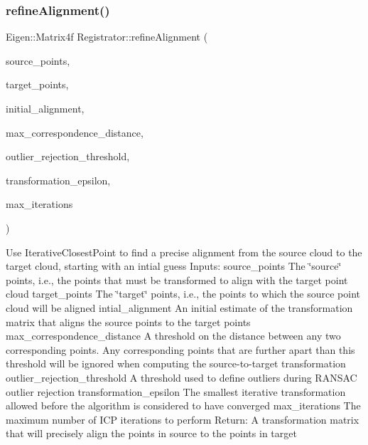 \subsubsection{\texorpdfstring{refine\+Alignment()}{refineAlignment()}}
{\footnotesize\ttfamily Eigen\+::\+Matrix4f Registrator\+::refine\+Alignment (\begin{DoxyParamCaption}\item[{const pcl\+::\+Point\+Cloud$<$ pcl\+::\+Point\+X\+Y\+Z\+R\+GB $>$\+::Ptr \&}]{source\+\_\+points,  }\item[{const pcl\+::\+Point\+Cloud$<$ pcl\+::\+Point\+X\+Y\+Z\+R\+GB $>$\+::Ptr \&}]{target\+\_\+points,  }\item[{const Eigen\+::\+Matrix4f \&}]{initial\+\_\+alignment,  }\item[{float}]{max\+\_\+correspondence\+\_\+distance,  }\item[{float}]{outlier\+\_\+rejection\+\_\+threshold,  }\item[{float}]{transformation\+\_\+epsilon,  }\item[{int}]{max\+\_\+iterations }\end{DoxyParamCaption})}

Use Iterative\+Closest\+Point to find a precise alignment from the source cloud to the target cloud, starting with an intial guess Inputs\+: source\+\_\+points The \char`\"{}source\char`\"{} points, i.\+e., the points that must be transformed to align with the target point cloud target\+\_\+points The \char`\"{}target\char`\"{} points, i.\+e., the points to which the source point cloud will be aligned intial\+\_\+alignment An initial estimate of the transformation matrix that aligns the source points to the target points max\+\_\+correspondence\+\_\+distance A threshold on the distance between any two corresponding points. Any corresponding points that are further apart than this threshold will be ignored when computing the source-\/to-\/target transformation outlier\+\_\+rejection\+\_\+threshold A threshold used to define outliers during R\+A\+N\+S\+AC outlier rejection transformation\+\_\+epsilon The smallest iterative transformation allowed before the algorithm is considered to have converged max\+\_\+iterations The maximum number of I\+CP iterations to perform Return\+: A transformation matrix that will precisely align the points in source to the points in target

